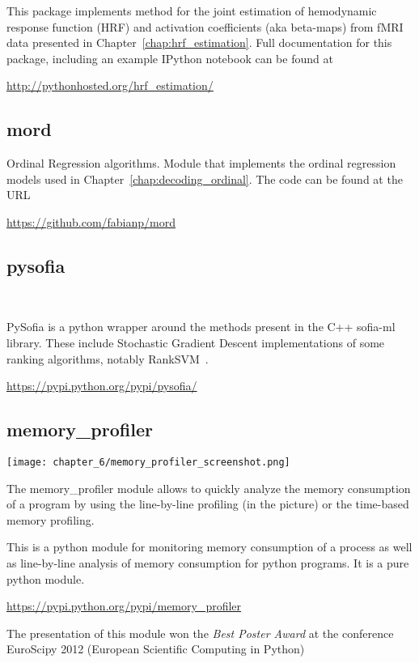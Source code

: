 This package implements method for the joint estimation of hemodynamic response function (HRF) and activation coefficients (aka beta-maps) from fMRI data presented in Chapter~\ref{chap:hrf_estimation}. Full documentation for this package, including an example IPython notebook can be found at 

\vspace{15pt}
\centerline{ \url{http://pythonhosted.org/hrf_estimation/}}

\subsection{mord}

Ordinal Regression algorithms. Module that implements the ordinal regression models used in Chapter~\ref{chap:decoding_ordinal}. The code can be found at the URL

\vspace{15pt}
\centerline{ \url{https://github.com/fabianp/mord}}

\subsection{pysofia}~\label{subsec:pysofia}

PySofia is a python wrapper around the methods present in the C++ sofia-ml library. These include Stochastic Gradient Descent implementations of some ranking algorithms, notably RankSVM~\citep{sculley2009large}.

\vspace{15pt}
\centerline{\url{https://pypi.python.org/pypi/pysofia/}}

\subsection{memory\_profiler}

\begin{marginfigure}
\texttt{[image: chapter\_6/memory\_profiler\_screenshot.png]}
\vspace{-10pt}\caption{The memory\_profiler module allows to quickly analyze the memory consumption of a program by using the line-by-line profiling (in the picture) or the time-based memory profiling.}
\end{marginfigure}

This is a python module for monitoring memory consumption of a process as well as line-by-line analysis of memory consumption for python programs. It is a pure python module.

\vspace{15pt}
\centerline{\url{https://pypi.python.org/pypi/memory_profiler}}
\vspace{10pt}



The presentation of this module won the \emph{Best Poster Award} at the conference EuroScipy 2012 (European Scientific Computing in Python)


\newpage

\begin{fullwidth}


\end{fullwidth}
